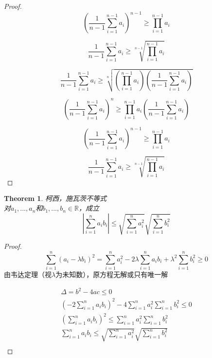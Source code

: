 \documentclass[10pt,a4paper]{book}
\newtheorem{theorem}{Theorem}[section]
\begin{document}
\begin{proof}
	\begin{equation}	
		(\frac{1}{n-1}\sum_{i=1}^{n-1}a_i)^{n-1}
		\geq \prod_{i=1}^{n-1}a_i
	\end{equation}


	\begin{equation}		
		\frac{1}{n-1}\sum_{i=1}^{n-1}a_i
		\geq \sqrt[n-1]{\prod_{i=1}^{n-1}a_i}
	\end{equation}


	\begin{equation}
		\frac{1}{n-1}\sum_{i=1}^{n-1}a_i \geq \sqrt[n]{(\prod_{i=1}^{n-1}a_i)(\frac{1}{n-1}\sum_{i=1}^{n-1}a_i)}
	\end{equation}
	
	\begin{equation}
		( \frac{1}{n-1}\sum_{i=1}^{n-1}a_i )^n \geq \prod_{i=1}^{n-1}a_i(\frac{1}{n-1}\sum_{i=1}^{n-1}a_i)
	\end{equation}

	\begin{equation}
		( \frac{1}{n-1}\sum_{i=1}^{n-1}a_i )^{n-1} \geq \prod_{i=1}^{n-1}a_i
	\end{equation}
	
	\begin{equation}
		 \frac{1}{n-1}\sum_{i=1}^{n-1}a_i  \geq \sqrt[n-1]{\prod_{i=1}^{n-1}a_i}
	\end{equation}
	
	\end{proof}
	
	\begin{theorem}
		柯西，施瓦茨不等式\\	
		对$ a_1,\dots,a_n $和$ b_1, \dots ,b_n \in \mathbb{R}$，成立
		\begin{equation}
			|\sum_{i=1}^n a_ib_i|\leq \sqrt{\sum_{i=1}^n a_i^2}\sqrt{\sum_{i=1}^n b_i^2}
		\end{equation}
		\label{1.3.5}
	\end{theorem}
	\begin{proof}
		\[ \sum_{i=1}^n (a_i - \lambda b_i)^2 = \sum_{i=1}^n a_i^2 - 2\lambda \sum_{i=1}^n a_i b_i + \lambda^2 \sum_{i=1}^n b_i^2 \geq 0  \]
		由韦达定理（视$ \lambda $为未知数），原方程无解或只有唯一解
		
		\begin{equation}
			\begin{aligned}
				 \Delta = b^2-4ac \leq 0\\
				 (-2\sum_{i=1}^n a_i b_i)^2-4\sum_{i=1}^na_i^2\sum_{i=1}^nb_i^2\leq 0\\	
				 (\sum_{i=1}^n a_i b_i)^2 \leq \sum_{i=1}^na_i^2\sum_{i=1}^nb_i^2\\
				 \sum_{i=1}^n a_i b_i \leq \sqrt{\sum_{i=1}^na_i^2}\sqrt{\sum_{i=1}^nb_i^2}\\
			 \end{aligned}
		\end{equation}
	\end{proof}
\end{document}

